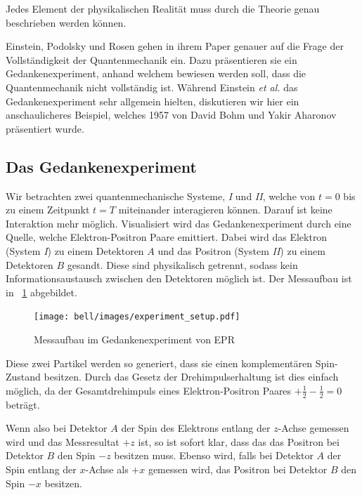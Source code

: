 \begin{refsection}
\begin{definition}\label{def:bell:Vollstaendigkeit}
    Jedes Element der physikalischen Realit\"at muss durch die Theorie
    genau beschrieben werden k\"onnen.
\end{definition}

Einstein, Podolsky und Rosen gehen in ihrem Paper genauer auf die Frage
der Vollst\"andigkeit der Quantenmechanik ein.
Dazu pr\"asentieren sie ein Gedankenexperiment, anhand welchem bewiesen
werden soll, dass die Quantenmechanik nicht vollst\"andig ist.
W\"ahrend Einstein \emph{et al.} das Gedankenexperiment sehr
allgemein hielten, diskutieren wir hier ein anschaulicheres Beispiel, welches
1957 von David Bohm und Yakir Aharonov \cite{Bell:Bohm1957} pr\"asentiert
wurde.

\subsection{Das Gedankenexperiment\label{subsection:bell:epr:idee}}
Wir betrachten zwei quantenmechanische Systeme, \textit{I} und \textit{II},
welche von $t=0$ bis zu einem Zeitpunkt $t=T$ miteinander 
interagieren k\"onnen. Darauf ist keine Interaktion mehr m\"oglich.
Visualisiert wird das Gedankenexperiment durch eine Quelle, welche
Elektron-Positron Paare emittiert. 
Dabei wird das Elektron (System \textit{I}) zu einem Detektoren $A$ und das 
Positron (System \textit{II}) zu einem Detektoren $B$ gesandt.
Diese sind physikalisch getrennt, sodass kein Informationsaustausch
zwischen den Detektoren m\"oglich ist.
Der Messaufbau ist in \figurename~\ref{fig:bell:EPR_Messaufbau} abgebildet.

\begin{figure}
    \centering
    \texttt{[image: bell/images/experiment\_setup.pdf]}
    \caption{Messaufbau im Gedankenexperiment von EPR}
    \label{fig:bell:EPR_Messaufbau}
\end{figure}

Diese zwei Partikel werden so generiert, dass sie einen komplement\"aren
Spin-Zustand besitzen. 
Durch das Gesetz der Drehimpulserhaltung
ist dies einfach m\"oglich, da der Gesamtdrehimpuls eines Elektron-Positron 
Paares $+\frac12 - \frac12 = 0$ betr\"agt.

Wenn also bei Detektor $A$ der Spin des Elektrons entlang der $z$-Achse
gemessen wird und das Messresultat $+z$ ist, so ist sofort klar, dass
das das Positron bei Detektor $B$ den Spin $-z$ besitzen muss. 
Ebenso wird, falls bei Detektor $A$ der Spin entlang der $x$-Achse als $+x$
gemessen wird, das Positron bei Detektor $B$ den Spin $-x$ besitzen.


\end{refsection}

